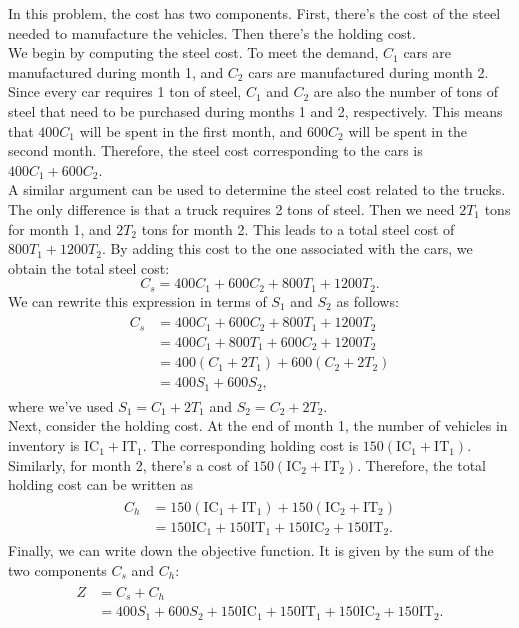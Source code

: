 \documentclass[11pt]{article}
\begin{document}
In this problem, the cost has two components. First, there's the cost of the
steel needed to manufacture the vehicles. Then there's the holding cost.\\
We begin by computing the steel cost. To meet the demand, \(C_1\) cars are
manufactured during month 1, and \(C_2\) cars are manufactured during month 2.
Since every car requires 1 ton of steel, \(C_1\) and \(C_2\) are also the
number of tons of steel that need to be purchased during months 1 and 2,
respectively. This means that \(400C_1\) will be spent in the first month, and
\(600C_2\) will be spent in the second month. Therefore, the steel cost
corresponding to the cars is \(400C_1+600C_2\).\\
A similar argument can be used to determine the steel cost related to the
trucks. The only difference is that a truck requires 2 tons of steel. Then we
need \(2T_1\) tons for month 1, and \(2T_2\) tons for month 2. This leads to
a total steel cost of \(800T_1+1200T_2\). By adding this cost to the one
associated with the cars, we obtain the total steel cost:
\begin{equation}
C_s=400C_1+600C_2+800T_1+1200T_2.
\end{equation}
We can rewrite this expression in terms of \(S_1\) and \(S_2\) as follows:
\begin{align}
  \begin{split}
    C_s&=400C_1+600C_2+800T_1+1200T_2\\
    &=400C_1+800T_1+600C_2+1200T_2\\
    &=400(C_1+2T_1)+600(C_2+2T_2)\\
    &=400S_1+600S_2,
  \end{split}
\end{align}
where we've used \(S_1=C_1+2T_1\) and \(S_2=C_2+2T_2\).\\
Next, consider the holding cost. At the end of month 1, the number of vehicles
in inventory is \(\mathrm{IC}_1+\mathrm{IT}_1\). The corresponding holding
cost is \(150(\mathrm{IC}_1+\mathrm{IT}_1)\). Similarly, for month 2, there's
a cost of \(150(\mathrm{IC}_2+\mathrm{IT}_2)\). Therefore, the total holding
cost can be written as
\begin{align}
  \begin{split}
    C_h&=150(\mathrm{IC}_1+\mathrm{IT}_1)+150(\mathrm{IC}_2+\mathrm{IT}_2)\\
    &=150\mathrm{IC}_1+150\mathrm{IT}_1+150\mathrm{IC}_2+150\mathrm{IT}_2.
  \end{split}
\end{align}
Finally, we can write down the objective function. It is given by the sum of the
two components \(C_s\) and \(C_h\):
\begin{align}
  \begin{split}
    Z&=C_s+C_h\\
    &=400S_1+600S_2+150\mathrm{IC}_1+150\mathrm{IT}_1+150\mathrm{IC}_2+150\mathrm{IT}_2.
  \end{split}
\end{align}
\end{document}
